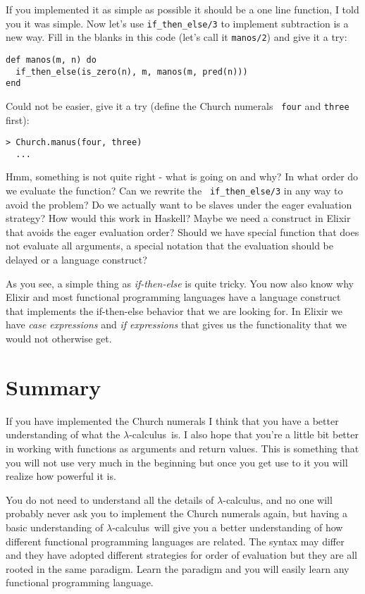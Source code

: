 \documentclass[a4paper,11pt]{article}
\newcommand{\lamc}[0]{$\lambda$-calculus}
\begin{document}
If you implemented it as simple as possible it should be a one line
function, I told you it was simple. Now let's use {\tt if\_then\_else/3}
to implement subtraction is a new way. Fill in the blanks in this code
(let's call it {\tt manos/2}) and give it a try:

\begin{verbatim}
def manos(m, n) do
  if_then_else(is_zero(n), m, manos(m, pred(n)))
end
\end{verbatim}

Could not be easier, give it a try (define the Church numerals {\tt
  four} and {\tt three} first):
  
\begin{verbatim}
> Church.manus(four, three)
  ...
\end{verbatim}

Hmm, something is not quite right - what is going on and why? In what
order do we evaluate the function?  Can we rewrite the {\tt
  if\_then\_else/3} in any way to avoid the problem? Do we actually want
to be slaves under the eager evaluation strategy? How would this work
in Haskell?  Maybe we need a construct in Elixir that avoids the eager
evaluation order? Should we have special function that does not
evaluate all arguments, a special notation that the evaluation should
be delayed or a language construct?

As you see, a simple thing as {\em if-then-else} is quite tricky. You
now also know why Elixir and most functional programming languages have
a language construct that implements the if-then-else behavior that we
are looking for. In Elixir we have {\em case expressions} and {\em if
  expressions} that gives us the functionality that we would not
otherwise get.



\section{Summary}

If you have implemented the Church numerals I think that you have a
better understanding of what the \lamc\ is. I also hope that you're a
little bit better in working with functions as arguments and return
values. This is something that you will not use very much in the
beginning but once you get use to it you will realize how powerful it
is.

You do not need to understand all the details of \lamc , and no one
will probably never ask you to implement the Church numerals again,
but having a basic understanding of \lamc\ will give you a better
understanding of how different functional programming languages are
related. The syntax may differ and they have adopted different
strategies for order of evaluation but they are all rooted in the same
paradigm. Learn the paradigm and you will easily learn any functional
programming language.
\end{document}
